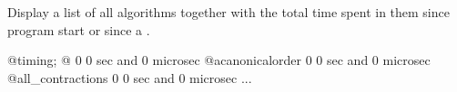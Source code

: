 
Display a list of all algorithms together with the total time spent in
them since program start or since a .
\begin{screen}{1}
@timing;
                             @           0  0 sec and 0 microsec
              @acanonicalorder           0  0 sec and 0 microsec
             @all_contractions           0  0 sec and 0 microsec
...
\end{screen}
~

